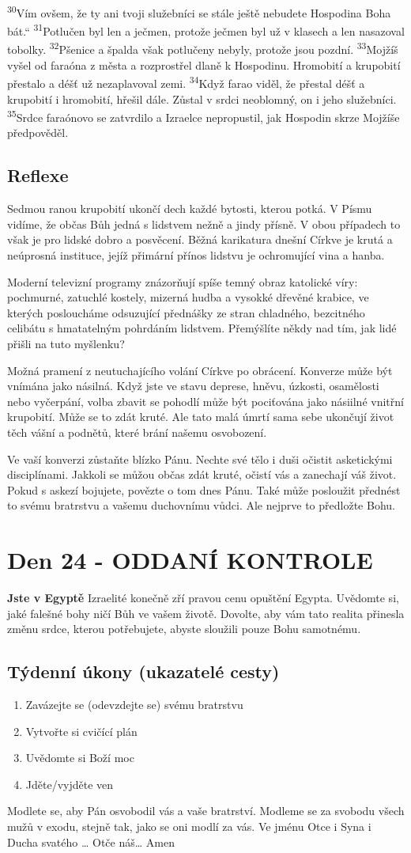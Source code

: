 \documentclass[11pt]{article}
\newcommand{\zacatekCtvrtyTyden}{
  \textbf{Jste v Egyptě} \newline
  Izraelité konečně zří pravou cenu opuštění Egypta. Uvědomte si, jaké falešné bohy ničí Bůh ve vašem životě.
Dovolte, aby vám tato realita přinesla změnu srdce, kterou potřebujete, abyste sloužili pouze Bohu samotnému.

\subsection*{Týdenní úkony (ukazatelé cesty)}
\begin{enumerate}
  \item Zavázejte se (odevzdejte se) svému bratrstvu
  \item Vytvořte si cvičící plán
  \item Uvědomte si Boží moc
  \item Jděte/vyjděte ven
\end{enumerate}
Modlete se, aby Pán osvobodil vás a vaše bratrství. \newline
Modleme se za svobodu všech mužů v exodu, stejně tak, jako se oni modlí za vás.\newline
Ve jménu Otce i Syna i Ducha svatého …  Otče náš… Amen
}
\begin{document}
{\textsuperscript{30}Vím ovšem, že ty ani tvoji služebníci se stále ještě nebudete Hospodina Boha bát.“
\textsuperscript{31}Potlučen byl len a ječmen, protože ječmen byl už v klasech a len nasazoval tobolky.
\textsuperscript{32}Pšenice a špalda však potlučeny nebyly, protože jsou pozdní.
\textsuperscript{33}Mojžíš vyšel od faraóna z města a rozprostřel dlaně k Hospodinu. Hromobití a krupobití přestalo a déšť už nezaplavoval zemi.
\textsuperscript{34}Když farao viděl, že přestal déšť a krupobití i hromobití, hřešil dále. Zůstal v srdci neoblomný, on i jeho služebníci.
\textsuperscript{35}Srdce faraónovo se zatvrdilo a Izraelce nepropustil, jak Hospodin skrze Mojžíše předpověděl.
}

\subsection*{Reflexe}
Sedmou ranou krupobití ukončí dech každé bytosti, kterou potká. V Písmu vidíme, že občas Bůh jedná s lidstvem nežně a
jindy přísně. V obou případech to však je pro lidské dobro a posvěcení.
Běžná karikatura dnešní Církve je krutá a neúprosná instituce, jejíž přimární přínos lidstvu je ochromující vina a hanba.

Moderní televizní programy znázorňují spíše temný obraz katolické víry: pochmurné, zatuchlé kostely, mizerná hudba a
vysokké dřevěné krabice, ve kterých posloucháme odsuzující přednášky ze stran chladného, bezcitného celibátu s hmatatelným
pohrdáním lidstvem. Přemýšlíte někdy nad tím, jak lidé přišli na tuto myšlenku?

Možná pramení z neutuchajícího volání Církve po obrácení. Konverze může být vnímána jako násilná. Když jste ve stavu
deprese, hněvu, úzkosti, osamělosti nebo vyčerpání, volba zbavit se pohodlí může být pociťována jako násiilné vnitřní
krupobití. Může se to zdát kruté. Ale tato malá úmrtí sama sebe ukončují život těch vášní a podnětů, které brání našemu
osvobození.

Ve vaší konverzi zůstaňte blízko Pánu. Nechte své tělo i duši očistit asketickými disciplínami. Jakkoli se můžou občas zdát
kruté, očistí vás a zanechají váš život. Pokud s askezí bojujete, povězte o tom dnes Pánu. Také může posloužit přednést to
svému bratrstvu a vašemu duchovnímu vůdci. Ale nejprve to předložte Bohu.

\newpage
\section{Den 24 - ODDANÍ KONTROLE}
\zacatekCtvrtyTyden
\end{document}

